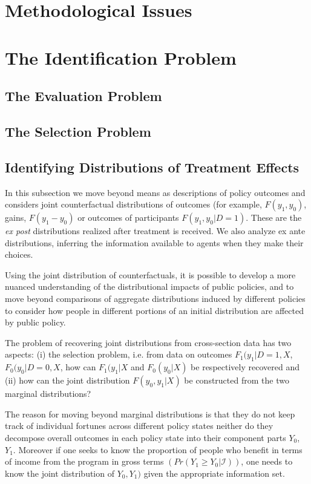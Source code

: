 \documentclass[12pt]{article}
\theoremstyle{definition}
\begin{document}
\section{Methodological Issues}
\pagebreak

\section{The Identification Problem}

\subsection{The Evaluation Problem}

\subsection{The Selection Problem}

\pagebreak
\subsection{Identifying Distributions of Treatment Effects}
In this subsection we move beyond means as descriptions of policy outcomes and considers joint counterfactual distributions of outcomes (for example, $F(y_1, y_0)$, gains, $F(y_1 - y_0)$ or outcomes of participants $F(y_1, y_0|D=1)$. These are the \textit{ex post} distributions realized after treatment is received. We also analyze ex ante distributions, inferring the information available to agents when they make their choices.

Using the joint distribution of counterfactuals, it is possible to develop a more nuanced understanding of the distributional impacts of public policies, and to move beyond comparisons of aggregate distributions induced by different policies to consider how people in different portions of an initial distribution are affected by public policy.

The problem of recovering joint distributions from cross-section data has two aspects: (i) the selection problem, i.e. from data on outcomes $F_1(y_1|D=1, X$, $F_0(y_0|D=0, X$, how can $F_1(y_1|X$ and $F_0(y_0|X)$ be respectively recovered and (ii) how can the joint distribution $F(y_0, y_1|X)$ be constructed from the two marginal distributions?

The reason for moving beyond marginal distributions is that they do not keep track of individual fortunes across different policy states neither do they decompose overall outcomes in each policy state into their component parts $Y_0$, $Y_1$. Moreover if one seeks to know the proportion of people who benefit in terms of income from the program in gross terms $(Pr(Y_1 \geqslant Y_0|\mathcal{I}))$, one needs to know the joint distribution of $Y_0, Y_1)$ given the appropriate information set.
\end{document}
